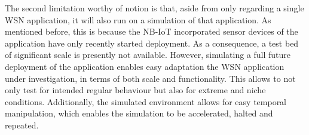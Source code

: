 The second limitation worthy of notion is that, aside from only regarding a single WSN application, it will also run on a simulation of that application. As mentioned before, this is because the NB-IoT incorporated sensor devices of the \sensit application have only recently started deployment. As a consequence, a test bed of significant scale is presently not available. However, simulating a full future deployment of the application enables easy adaptation the WSN application under investigation, in terms of both scale and functionality. This allows to not only test for intended regular behaviour but also for extreme and niche conditions. Additionally, the simulated environment allows for easy temporal manipulation, which enables the simulation to be accelerated, halted and repeated.



